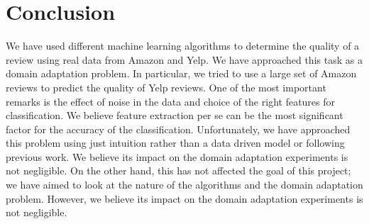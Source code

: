 \documentclass[letterpaper]{article}
\begin{document}
\section{Conclusion}
\label{sec:conclusion}

We have used different machine learning algorithms to determine the
quality of a review using real data from Amazon and Yelp. We have
approached this task as a domain adaptation problem. In particular, we
tried to use a large set of Amazon reviews to predict the quality of
Yelp reviews. One of the most important remarks is the effect of noise
in the data and choice of the right features for classification. We
believe feature extraction per se can be the most significant factor
for the accuracy of the classification. Unfortunately, we have
approached this problem using just intuition rather than a data driven
model or following previous work.  We believe its impact on the domain
adaptation experiments is not negligible. On the other hand, this has
not affected the goal of this project; we have aimed to look at the
nature of the algorithms and the domain adaptation
problem. However, we believe its impact on the domain adaptation
experiments is not negligible. 




\end{document}
